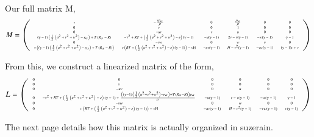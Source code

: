 \documentclass[letterpaper,11pt,nointlimits,reqno,draft]{amsart}
\begin{document}
Our full matrix M,
\begin{equation}
\tiny
M = 
\left(
\begin{array}{cccccc}
 v & -\frac{v \rho _{\alpha }}{\rho } & 0 & \frac{\rho _{\alpha }}{\rho } & 0 & 0 \\
 0 & v & 0 & 1 & 0 & 0 \\
 0 & -u v & v & u & 0 & 0 \\
 (\gamma -1) \left(\frac{1}{2} \left(u^2+v^2+w^2\right)-e_{\alpha }\right)+T \left(R_{\alpha }-R\right) & -v^2+R T+\left(\frac{1}{2} \left(u^2+v^2+w^2\right)-e\right) (\gamma
   -1) & -u (\gamma -1) & 2 v-v (\gamma -1) & -w (\gamma -1) & \gamma -1 \\
 0 & -v w & 0 & w & v & 0 \\
 v \left((\gamma -1) \left(\frac{1}{2} \left(u^2+v^2+w^2\right)-e_{\alpha }\right)+T \left(R_{\alpha }-R\right)\right) & v \left(R T+\left(\frac{1}{2}
   \left(u^2+v^2+w^2\right)-e\right) (\gamma -1)\right)-\text{vH} & -u v (\gamma -1) & H-v^2 (\gamma -1) & -v w (\gamma -1) & (\gamma -1) v+v
\end{array}
\right)
\end{equation}

From this, we construct a linearized matrix of the form,
\begin{equation}
\tiny
L = 
\left(
\begin{array}{cccccc}
 0 & 0 & 0 & 0 & 0 & 0 \\
 0 & v & 0 & 0 & 0 & 0 \\
 0 & -u v & 0 & u & 0 & 0 \\
 0 & -v^2+R T+\left(\frac{1}{2} \left(u^2+v^2+w^2\right)-e\right) (\gamma -1)+\frac{\left((\gamma -1) \left(\frac{1}{2} \left(u^2+v^2+w^2\right)-e_{\alpha }\right)+T
   \left(R_{\alpha }-R\right)\right) \rho _{\alpha }}{\rho } & -u (\gamma -1) & v-v (\gamma -1) & -w (\gamma -1) & \gamma -1 \\
 0 & -v w & 0 & w & 0 & 0 \\
 0 & v \left(R T+\left(\frac{1}{2} \left(u^2+v^2+w^2\right)-e\right) (\gamma -1)\right)-\text{vH} & -u v (\gamma -1) & H-v^2 (\gamma -1) & -v w (\gamma -1) & v (\gamma -1)
\end{array}
\right)
\end{equation}

The next page details how this matrix is actually organized in
suzerain. 
\end{document}
